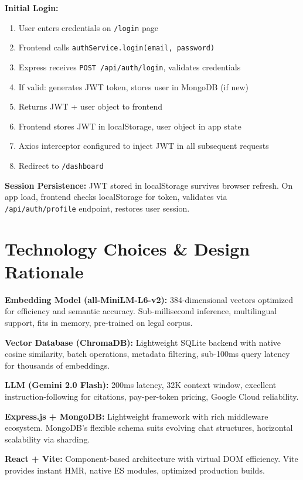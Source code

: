 \documentclass[12pt,a4paper]{article}
\begin{document}
\textbf{Initial Login:}
\begin{enumerate}
    \item User enters credentials on \texttt{/login} page
    \item Frontend calls \texttt{authService.login(email, password)}
    \item Express receives \texttt{POST /api/auth/login}, validates credentials
    \item If valid: generates JWT token, stores user in MongoDB (if new)
    \item Returns JWT + user object to frontend
    \item Frontend stores JWT in localStorage, user object in app state
    \item Axios interceptor configured to inject JWT in all subsequent requests
    \item Redirect to \texttt{/dashboard}
\end{enumerate}

\textbf{Session Persistence:} JWT stored in localStorage survives browser refresh. On app load, frontend checks localStorage for token, validates via \texttt{/api/auth/profile} endpoint, restores user session.

\section{Technology Choices \& Design Rationale}

\textbf{Embedding Model (all-MiniLM-L6-v2):} 384-dimensional vectors optimized for efficiency and semantic accuracy. Sub-millisecond inference, multilingual support, fits in memory, pre-trained on legal corpus.

\textbf{Vector Database (ChromaDB):} Lightweight SQLite backend with native cosine similarity, batch operations, metadata filtering, sub-100ms query latency for thousands of embeddings.

\textbf{LLM (Gemini 2.0 Flash):} 200ms latency, 32K context window, excellent instruction-following for citations, pay-per-token pricing, Google Cloud reliability.

\textbf{Express.js + MongoDB:} Lightweight framework with rich middleware ecosystem. MongoDB's flexible schema suits evolving chat structures, horizontal scalability via sharding.

\textbf{React + Vite:} Component-based architecture with virtual DOM efficiency. Vite provides instant HMR, native ES modules, optimized production builds.
\end{document}

